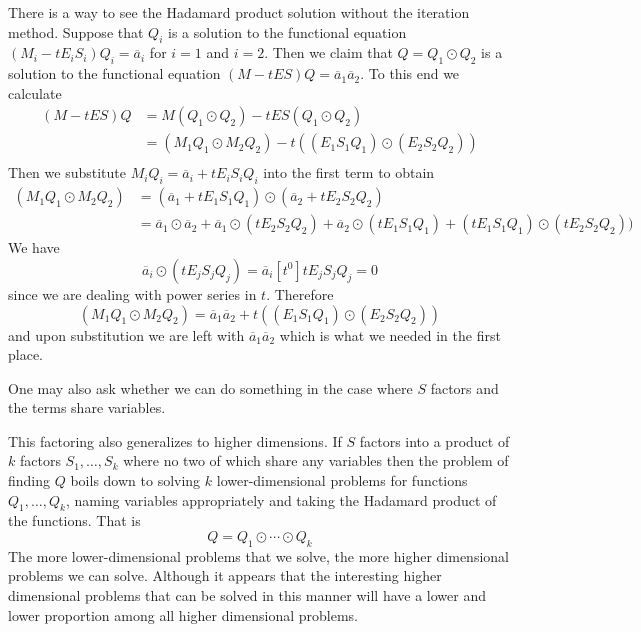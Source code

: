 \documentclass[12pt]{article}
\theoremstyle{definition} \newtheorem{definition}[theorem]{Definition}
\newcommand{\ol}[1]{\overline{#1}}
\begin{document}
There is a way to see the Hadamard product solution without the iteration method. Suppose that $Q_i$ is a solution to the functional equation $(M_i - tE_iS_i)Q_i = \ol{a}_i$ for $i = 1$ and $i = 2$. Then we claim that $Q = Q_1 \odot Q_2$ is a solution to the functional equation $(M - tES)Q = \ol{a}_1\ol{a}_2$. To this end we calculate
\begin{align*}
	(M-tES)Q &= M (Q_1\odot Q_2) - tES(Q_1\odot Q_2)\\
	& = (M_1Q_1\odot M_2Q_2) - t((E_1S_1Q_1)\odot (E_2S_2Q_2))\\
\end{align*}
Then we substitute $ M_i Q_i = \ol{a}_i + tE_iS_iQ_i$ into the first term to obtain
\begin{align*}
	 (M_1Q_1\odot M_2Q_2) &= (\ol{a}_1+ t E_1 S_1 Q_1)\odot(\ol{a}_2 + t E_2 S_2 Q_2)\\
	 & = \ol{a}_1\odot\ol{a}_2 + \ol{a}_1\odot (t E_2 S_2 Q_2) + \ol{a}_2\odot(t E_1 S_1 Q_1) + (t E_1 S_1 Q_1)\odot(t E_2 S_2 Q_2))
\end{align*}
We have
\[
	\ol{a}_i\odot (t E_j S_j Q_j) = \ol{a}_i [t^0]t E_j S_j Q_j = 0
\]
since we are dealing with power series in $t$. Therefore
\[
	(M_1Q_1\odot M_2Q_2) =  \ol{a}_1\ol{a}_2 +t ((E_1 S_1 Q_1)\odot (E_2 S_2 Q_2))
\]
and upon substitution we are left with $\ol{a}_1\ol{a}_2$ which is what we needed in the first place.

One may also ask whether we can do something in the case where $S$ factors and the terms share variables.

This factoring also generalizes to higher dimensions. If $S$ factors into a product of $k$ factors $S_1,\ldots, S_k$ where no two of which share any variables then the problem of finding $Q$ boils down to solving $k$ lower-dimensional problems for functions $Q_1,\ldots, Q_k$, naming variables appropriately and taking the Hadamard product of the functions. That is
\[
	Q = Q_1 \odot \cdots \odot Q_k
\]
The more lower-dimensional problems that we solve, the more higher dimensional problems we can solve. Although it appears that the interesting higher dimensional problems that can be solved in this manner will have a lower and lower proportion among all higher dimensional problems.
\end{document}
